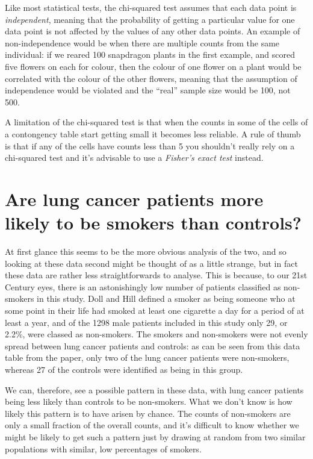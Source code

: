 \documentclass[
]{book}
\begin{document}
Like most statistical tests, the chi-squared test assumes that each data point is \emph{independent}, meaning that the probability of getting a particular value for one data point is not affected by the values of any other data points. An example of non-independence would be when there are multiple counts from the same individual: if we reared 100 snapdragon plants in the first example, and scored five flowers on each for colour, then the colour of one flower on a plant would be correlated with the colour of the other flowers, meaning that the assumption of independence would be violated and the ``real'' sample size would be 100, not 500.

A limitation of the chi-squared test is that when the counts in some of the cells of a contongency table start getting small it becomes less reliable. A rule of thumb is that if any of the cells have counts less than 5 you shouldn't really rely on a chi-squared test and it's advisable to use a \emph{Fisher's exact test} instead.

\hypertarget{are-lung-cancer-patients-more-likely-to-be-smokers-than-controls}{%
\section{Are lung cancer patients more likely to be smokers than controls?}\label{are-lung-cancer-patients-more-likely-to-be-smokers-than-controls}}

At first glance this seems to be the more obvious analysis of the two, and so looking at these data second might be thought of as a little strange, but in fact these data are rather less straightforwards to analyse. This is because, to our 21st Century eyes, there is an astonishingly low number of patients classified as non-smokers in this study. Doll and Hill defined a smoker as being someone who at some point in their life had smoked at least one cigarette a day for a period of at least a year, and of the 1298 male patients included in this study only 29, or 2.2\%, were classed as non-smokers. The smokers and non-smokers were not evenly spread between lung cancer patients and controls: as can be seen from this data table from the paper, only two of the lung cancer patients were non-smokers, whereas 27 of the controls were identified as being in this group.

We can, therefore, see a possible pattern in these data, with lung cancer patients being less likely than controls to be non-smokers. What we don't know is how likely this pattern is to have arisen by chance. The counts of non-smokers are only a small fraction of the overall counts, and it's difficult to know whether we might be likely to get such a pattern just by drawing at random from two similar populations with similar, low percentages of smokers.
\end{document}
